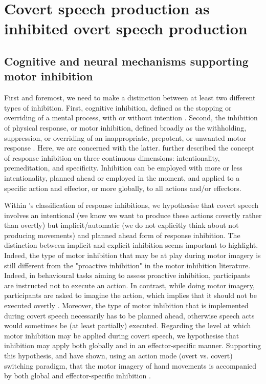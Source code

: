\documentclass[utf8]{template/frontiersSCNS} %
\begin{document}
\section{Covert speech production as inhibited overt speech production}

\subsection{Cognitive and neural mechanisms supporting motor inhibition}

First and foremost, we need to make a distinction between at least two different types of inhibition. First, cognitive inhibition, defined as the stopping or overriding of a mental process, with or without intention \citep{gorfein_concept_2007}. Second, the inhibition of physical response, or motor inhibition, defined broadly as the withholding, suppression, or overriding of an inappropriate, prepotent, or unwanted motor response \citep{aron_neural_2007, oshea_go_2018}. Here, we are concerned with the latter. \cite{ridderinkhof_dont_2014} further described the concept of response inhibition on three continuous dimensions: intentionality, premeditation, and specificity. Inhibition can be employed with more or less intentionality, planned ahead or employed in the moment, and applied to a specific action and effector, or more globally, to all actions and/or effectors.

Within \citeauthor{ridderinkhof_dont_2014}'s classification of response inhibitions, we hypothesise that covert speech involves an intentional (we know we want to produce these actions covertly rather than overtly) but implicit/automatic (we do not explicitly think about not producing movements) and planned ahead form of response inhibition. The distinction between implicit and explicit inhibition seems important to highlight. Indeed, the type of motor inhibition that may be at play during motor imagery is still different from the "proactive inhibition" in the motor inhibition literature. Indeed, in behavioural tasks aiming to assess proactive inhibition, participants are instructed not to execute an action. In contrast, while doing motor imagery, participants are asked to imagine the action, which implies that it should not be executed overtly \citep{guillot_imagining_2012}. Moreover, the type of motor inhibition that is implemented during covert speech necessarily has to be planned ahead, otherwise speech acts would sometimes be (at least partially) executed. Regarding the level at which motor inhibition may be applied during covert speech, we hypothesise that inhibition may apply both globally and in an effector-specific manner. Supporting this hypothesis, \cite{rieger_inhibition_2017} and \cite{bart_inhibitory_2021} have shown, using an action mode (overt vs. covert) switching paradigm, that the motor imagery of hand movements is accompanied by both global and effector-specific inhibition \citep[these results were also replicated in][]{scheil_motor_2018}.
\end{document}
